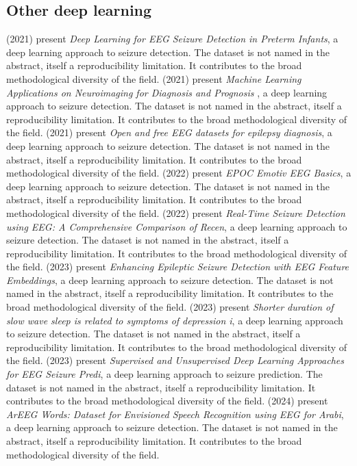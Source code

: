 \subsection{Other deep learning}
\citet{ep210600611} (2021) present \emph{Deep Learning for EEG Seizure Detection in Preterm Infants}, a deep learning approach to seizure detection. The dataset is not named in the abstract, itself a reproducibility limitation. It contributes to the broad methodological diversity of the field.
\citet{ep210203336} (2021) present \emph{Machine Learning Applications on Neuroimaging for Diagnosis and Prognosis }, a deep learning approach to seizure detection. The dataset is not named in the abstract, itself a reproducibility limitation. It contributes to the broad methodological diversity of the field.
\citet{ep210801030} (2021) present \emph{Open and free EEG datasets for epilepsy diagnosis}, a deep learning approach to seizure detection. The dataset is not named in the abstract, itself a reproducibility limitation. It contributes to the broad methodological diversity of the field.
\citet{ep220609051} (2022) present \emph{EPOC Emotiv EEG Basics}, a deep learning approach to seizure detection. The dataset is not named in the abstract, itself a reproducibility limitation. It contributes to the broad methodological diversity of the field.
\citet{ep220108780} (2022) present \emph{Real-Time Seizure Detection using EEG: A Comprehensive Comparison of Recen}, a deep learning approach to seizure detection. The dataset is not named in the abstract, itself a reproducibility limitation. It contributes to the broad methodological diversity of the field.
\citet{ep231018767} (2023) present \emph{Enhancing Epileptic Seizure Detection with EEG Feature Embeddings}, a deep learning approach to seizure detection. The dataset is not named in the abstract, itself a reproducibility limitation. It contributes to the broad methodological diversity of the field.
\citet{ep231101280} (2023) present \emph{Shorter duration of slow wave sleep is related to symptoms of depression i}, a deep learning approach to seizure detection. The dataset is not named in the abstract, itself a reproducibility limitation. It contributes to the broad methodological diversity of the field.
\citet{ep230414922} (2023) present \emph{Supervised and Unsupervised Deep Learning Approaches for EEG Seizure Predi}, a deep learning approach to seizure prediction. The dataset is not named in the abstract, itself a reproducibility limitation. It contributes to the broad methodological diversity of the field.
\citet{ep241118888} (2024) present \emph{ArEEG Words: Dataset for Envisioned Speech Recognition using EEG for Arabi}, a deep learning approach to seizure detection. The dataset is not named in the abstract, itself a reproducibility limitation. It contributes to the broad methodological diversity of the field.
